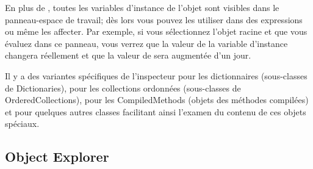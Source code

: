 \documentclass[a4paper,10pt,twoside]{book}
\begin{document}
En plus de , toutes les variables d'instance de l'objet sont
visibles dans le panneau-espace de travail; dès lors vous pouvez
les utiliser dans des expressions ou même les affecter.
Par exemple, si vous sélectionnez l'objet racine et que vous
évaluez  dans ce panneau,
vous verrez que la valeur de la variable d'instance  
changera réellement et que la valeur de  
sera augmentée d'un jour.


Il y a des variantes spécifiques de l'inspecteur pour les dictionnaires (sous-classes 
de Dictionaries), pour les collections ordonnées (sous-classes de OrderedCollections), 
pour les CompiledMethods (objets des méthodes compilées) et pour quelques autres classes 
facilitant ainsi l'examen du contenu de ces objets spéciaux.

\subsection{Object Explorer}

\end{document}
